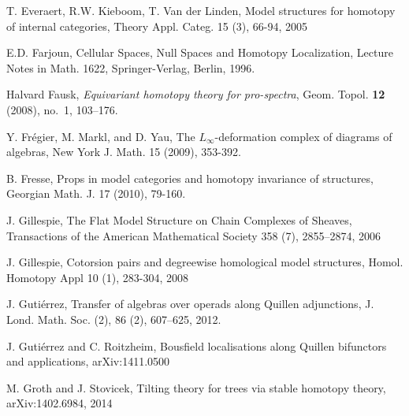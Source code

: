 \documentclass[11pt,reqno]{amsart}
\theoremstyle{definition}
\numberwithin{equation}{subsection}
\begin{document}
\begin{thebibliography}{AAAAAA}

 T. Everaert, R.W. Kieboom, T. Van der Linden, Model structures for homotopy of internal categories, Theory Appl. Categ. 15 (3), 66-94, 2005

E.D. Farjoun, Cellular Spaces, Null Spaces and Homotopy Localization, Lecture Notes in Math. 1622, Springer-Verlag, Berlin, 1996.


Halvard Fausk, \emph{Equivariant homotopy theory for pro-spectra}, Geom. Topol.
  \textbf{12} (2008), no.~1, 103--176. 



Y. Fr\'{e}gier, M. Markl, and D. Yau, The $L_\infty$-deformation complex of diagrams of algebras, New York J. Math. 15 (2009), 353-392.


B. Fresse, Props in model categories and homotopy invariance of structures, Georgian Math. J. 17 (2010), 79-160.

 J. Gillespie, The Flat Model Structure on Chain Complexes of Sheaves, Transactions of the American Mathematical Society 358 (7), 2855--2874, 2006

 J. Gillespie, Cotorsion pairs and degreewise homological model structures, Homol. Homotopy Appl 10 (1), 283-304, 2008

 J. Guti{\'e}rrez, Transfer of algebras over operads along {Q}uillen adjunctions, J. Lond. Math. Soc. (2), 86 (2), 607--625, 2012.

 J. Guti{\'e}rrez and C. Roitzheim, {B}ousfield localisations along {Q}uillen bifunctors and applications, arXiv:1411.0500





 M. Groth and J. Stovicek, Tilting theory for trees via stable homotopy theory, arXiv:1402.6984, 2014



\end{thebibliography}
\end{document}

